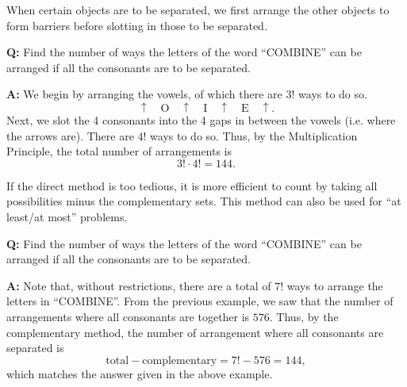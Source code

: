 \begin{method}
    When certain objects are to be separated, we first arrange the other objects to form barriers before slotting in those to be separated.
\end{method}

\begin{example}
    \phantom{.}

    \textbf{Q:} Find the number of ways the letters of the word ``COMBINE'' can be arranged if all the consonants are to be separated.

    \textbf{A:} We begin by arranging the vowels, of which there are $3!$ ways to do so. \[\uparrow \quad \boxed{\text{O}} \quad \uparrow \quad \boxed{\text{I}} \quad \uparrow \quad \boxed{\text{E}} \quad \uparrow.\] Next, we slot the 4 consonants into the 4 gaps in between the vowels (i.e. where the arrows are). There are $4!$ ways to do so. Thus, by the Multiplication Principle, the total number of arrangements is \[3! \cdot 4! = 144.\]
\end{example}

\begin{method}
    If the direct method is too tedious, it is more efficient to count by taking all possibilities minus the complementary sets. This method can also be used for ``at least/at most'' problems.
\end{method}

\begin{example}
    \phantom{.}
    
    \textbf{Q:} Find the number of ways the letters of the word ``COMBINE'' can be arranged if all the consonants are to be separated.

    \textbf{A:} Note that, without restrictions, there are a total of $7!$ ways to arrange the letters in ``COMBINE''. From the previous example, we saw that the number of arrangements where all consonants are together is $576$. Thus, by the complementary method, the number of arrangement where all consonants are separated is \[\text{total} - \text{complementary} = 7! - 576 = 144,\] which matches the answer given in the above example.
\end{example}
